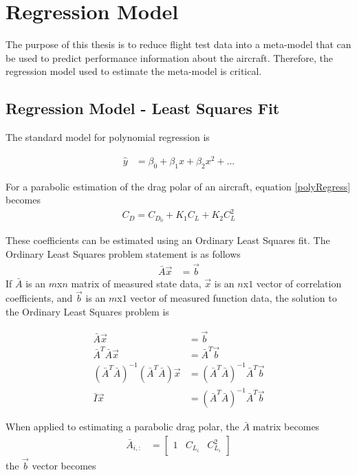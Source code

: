\chapter{Regression Model}
The purpose of this thesis is to reduce flight test data into a meta-model that can be used to predict performance information about the aircraft. Therefore, the regression model used to estimate the meta-model is critical. 

\section{Regression Model - Least Squares Fit}
The standard model for polynomial regression is

\begin{align}
\label{polyRegress}
\hat{y} &= \beta_0 + \beta_1x + \beta_2x^2+...
\end{align}

For a parabolic estimation of the drag polar of an aircraft, equation \ref{polyRegress} becomes
\begin{align}
C_D = C_{D_0} + K_1 C_L+K_2 C^2_L
\end{align}

These coefficients can be estimated using an Ordinary Least Squares fit. The Ordinary Least Squares problem statement is as follows
\begin{align}
\bar{A}\vec{x} &= \vec{b}
\end{align}
If $\bar{A}$ is an $m$x$n$ matrix of measured state data, $\vec{x}$ is an $n$x$1$ vector of correlation coefficients, and $\vec{b}$ is an $m$x$1$ vector of measured function data, the solution to the Ordinary Least Squares problem is 

\begin{align}
\bar{A}\vec{x}&=\vec{b}\\
\bar{A}^T\bar{A}\vec{x} &= \bar{A}^T\vec{b}\\
(\bar{A}^T\bar{A})^{-1}(\bar{A}^T \bar{A})\vec{x} &= (\bar{A}^T\bar{A})^{-1}\bar{A}^T\vec{b}\\
\bar{I}\vec{x} &=(\bar{A}^T\bar{A})^{-1}\bar{A}^T\vec{b}
\end{align}

When applied to estimating a parabolic drag polar, the $\bar{A}$ matrix becomes
\begin{align}
\bar{A}_{i,:} &= 
\begin{bmatrix}
1 & C_{L_i} & C^2_{L_i}
\end{bmatrix}
\end{align}
the $\vec{b}$ vector becomes


